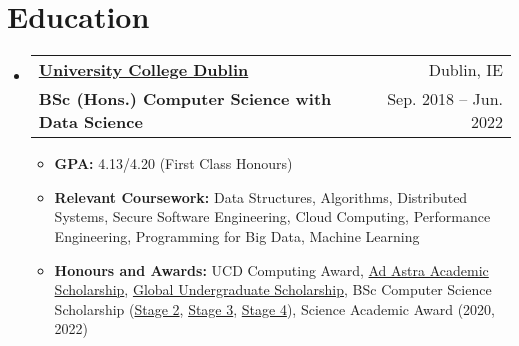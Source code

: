 \documentclass[letterpaper,11pt]{article}
\makeatletter
\newcommand{\cvItem}[1]{
	\item\small{
		{#1 \vspace{-2pt}}
	}
}
\newcommand{\cvSubheading}[4]{
	\vspace{-2pt}\item
	\begin{tabular*}{0.97\textwidth}[t]{l@{\extracolsep{\fill}}r}
		\textbf{#1} & #2 \\
		{#3} & #4 \\
	\end{tabular*}\vspace{-7pt}
}
\newcommand{\cvSubHeadingListStart}{\begin{itemize}[leftmargin=0.15in, label={}]}
\newcommand{\cvSubHeadingListEnd}{\end{itemize}}
\newcommand{\cvItemListStart}{\begin{itemize}}
\newcommand{\cvItemListEnd}{\end{itemize}\vspace{-1pt}}
\makeatother
\begin{document}
\section{Education}
\cvSubHeadingListStart
\cvSubheading
{\href{https://www.ucd.ie/cs/}{University College Dublin}}{Dublin, IE}
{\textbf{BSc (Hons.) Computer Science with Data Science}}{Sep. 2018 -- Jun. 2022}

\cvItemListStart
\cvItem{\textbf{GPA:} 4.13/4.20 (First Class Honours)}
\cvItem{\textbf{Relevant Coursework:}
  Data Structures, Algorithms,
  Distributed Systems,
  Secure Software Engineering,
  Cloud Computing,
  Performance Engineering,
  Programming for Big Data,
  Machine Learning}

\cvItem{\textbf{Honours and Awards:}
  UCD Computing Award,
  \href{https://www.ucd.ie/adastraacademy/academic/}{Ad Astra Academic Scholarship},
  \href{https://www.ucd.ie/global/scholarships/}{Global Undergraduate Scholarship},
  BSc Computer Science Scholarship
  (\href{https://sisweb.ucd.ie/usis/W_HU_REPORTING.P_DISPLAY_QUERY?p_query=SC101-1A&p_parameters=A8A08F4E214445171B5771A1009E1D5B2E8D2BA93239FA8867648F2551D1F6E74111E7B3FBB422649785AC454612F967929BC94109BC9FA35BEAD1F53D23BA161359586343D3237CFDBE22184AE066F37B92C3B3C7382336AC2A2EAE5A092F63FC7A402CF2646B9597CDAAB378E40E1B}{Stage 2},
  \href{https://sisweb.ucd.ie/usis/W_HU_REPORTING.P_DISPLAY_QUERY?p_query=SC101-1A&p_parameters=A8A08F4E214445171B5771A1009E1D5B2E8D2BA93239FA8867648F2551D1F6E74111E7B3FBB422649785AC454612F96787A57507118273967D6FD3CA5758624C79D7843C965FDFB69E23ABD0A5BF3B8352A54C50CBC563B72C4800831552834F550B235F0EFC644A6070F3328CE618D803B3E3CD94D6ADF3C463A5184F86FFAB}{Stage 3},
  \href{https://hub.ucd.ie/usis/W_HU_REPORTING.P_DISPLAY_QUERY?p_query=SC101-1A&p_parameters=A8A08F4E214445171B5771A1009E1D5B2E8D2BA93239FA8867648F2551D1F6E74111E7B3FBB422649785AC454612F967AB057463726BFBD2F44F7545DFDE90BF68E76434A9F3F66B2D7280F061B44E47A154491B75B29B1C35AD7E6301B396F3181188D61C833A62D3514A39A8EAC1C1452649CCC93B578B2A8394D0736947AF}{Stage 4}),
  Science Academic Award (2020, 2022)}
\cvItemListEnd
\cvSubHeadingListEnd

\end{document}
